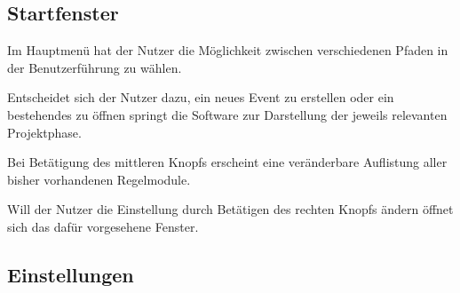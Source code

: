 \documentclass[11pt]{article}
\begin{document}
\subsection{Startfenster}


\vspace{1cm}

Im Hauptmenü hat der Nutzer die Möglichkeit zwischen verschiedenen Pfaden in der Benutzerführung zu wählen.

Entscheidet sich der Nutzer dazu, ein neues Event zu erstellen oder ein bestehendes zu öffnen springt die Software zur Darstellung der jeweils relevanten Projektphase.

Bei Betätigung des mittleren Knopfs erscheint eine veränderbare Auflistung aller bisher vorhandenen Regelmodule.

Will der Nutzer die Einstellung durch Betätigen des rechten Knopfs ändern öffnet sich das dafür vorgesehene Fenster.

\subsection{Einstellungen}

\end{document}
